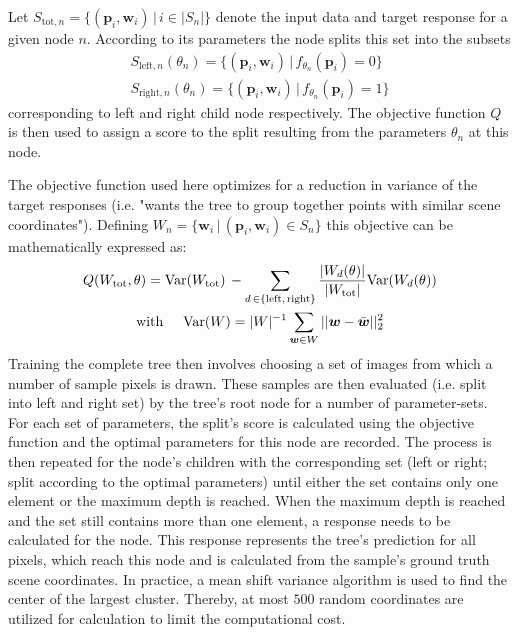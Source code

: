 \documentclass[final]{cvpr}
\begin{document}
Let $S_{\text{tot},n} = \{ (\boldsymbol{p}_i, \boldsymbol{w}_i) \, | \, i \in |S_n|\}$ denote the
input data and target response for a given node $n$. According to its parameters the
node splits this set into the subsets
\begin{equation}
\begin{split}
	S_{\text{left},n}(\theta_n) = \{(\boldsymbol{p}_i, \boldsymbol{w}_i) \,|\, f_{\theta_n}(\boldsymbol{p}_i) = 0\} \\
	S_{\text{right},n}(\theta_n) = \{(\boldsymbol{p}_i, \boldsymbol{w}_i) \,|\, f_{\theta_n}(\boldsymbol{p}_i) = 1\}
\end{split}
\end{equation}
corresponding to left and right child node respectively. The objective function $Q$ is
then used to assign a score to the split resulting from the parameters $\theta_n$ at
this node.

The objective function used here optimizes for a reduction in variance of the target 
responses (i.e. "wants the tree to group together points with similar scene coordinates").
Defining $W_n = \{ \boldsymbol{w}_i \, | \, (\boldsymbol{p}_i, \boldsymbol{w}_i) \in S_n \}$ this
objective can be mathematically expressed as:
\begin{multline}
	Q(W_\text{tot}, \theta) =
		\text{Var}(W_\text{tot})\, - \sum_{d\,\in\{\text{left,\,right}\}}
			\dfrac{|W_d(\theta)|}{|W_\text{tot}|} \text{Var}(W_d(\theta))\\
	\text{with} \hspace{5mm} \text{Var}(W) = |W|^{-1} \sum_{\boldsymbol{w}\in W} ||\boldsymbol{w} - \bar{\boldsymbol{w}}||_2^2
\end{multline}
Training the complete tree then involves choosing a set of images from which a number
of sample pixels is drawn. These samples are then evaluated (i.e. split into left and right set)
by the tree's root node for a number of parameter-sets. For each set of parameters, the
split's score is calculated using the objective function and the optimal parameters for
this node are recorded. The process is then repeated for the node's children with the corresponding
set (left or right; split according to the optimal parameters) until either the set contains
only one element or the maximum depth is reached.
When the maximum depth is reached and the set still contains more than one element, a response
needs to be calculated for the node. This response represents the tree's prediction for 
all pixels, which reach this node and is calculated from the sample's ground truth scene coordinates.
In practice, a mean shift variance algorithm \cite{Comaniciu2002} is used to find the center of the 
largest cluster. Thereby, at most $500$ random coordinates are utilized for calculation to limit 
the computational cost.
\end{document}

